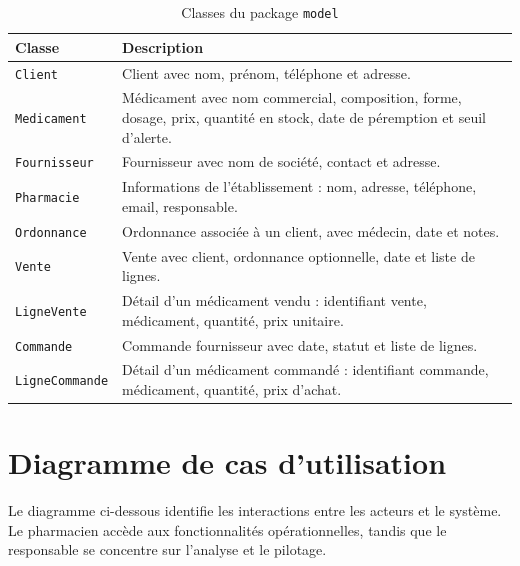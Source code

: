 \documentclass[12pt,a4paper]{report}
\begin{document}
\begin{table}[H]
\centering
\begin{tabularx}{\textwidth}{lX}
\toprule
\textbf{Classe} & \textbf{Description} \\
\midrule
\texttt{Client}         & Client avec nom, prénom, téléphone et adresse. \\
\texttt{Medicament}     & Médicament avec nom commercial, composition, forme, dosage, prix, quantité en stock, date de péremption et seuil d'alerte. \\
\texttt{Fournisseur}    & Fournisseur avec nom de société, contact et adresse. \\
\texttt{Pharmacie}      & Informations de l'établissement : nom, adresse, téléphone, email, responsable. \\
\texttt{Ordonnance}     & Ordonnance associée à un client, avec médecin, date et notes. \\
\texttt{Vente}          & Vente avec client, ordonnance optionnelle, date et liste de lignes. \\
\texttt{LigneVente}     & Détail d'un médicament vendu : identifiant vente, médicament, quantité, prix unitaire. \\
\texttt{Commande}       & Commande fournisseur avec date, statut et liste de lignes. \\
\texttt{LigneCommande}  & Détail d'un médicament commandé : identifiant commande, médicament, quantité, prix d'achat. \\
\bottomrule
\end{tabularx}
\caption{Classes du package \texttt{model}}
\end{table}

\section{Diagramme de cas d'utilisation}

Le diagramme ci-dessous identifie les interactions entre les acteurs et le système. Le pharmacien accède aux fonctionnalités opérationnelles, tandis que le responsable se concentre sur l'analyse et le pilotage.
\end{document}
